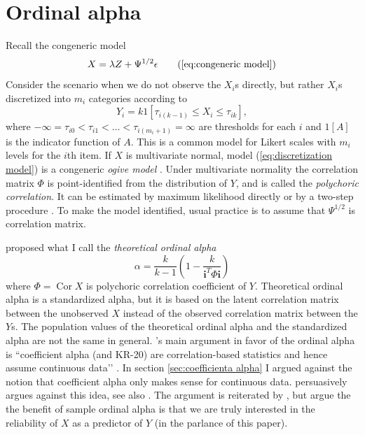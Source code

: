 \documentclass[twoside]{article}
\DeclareMathOperator{\Cor}{Cor}
\begin{document}
\section{Ordinal alpha\label{sec:Ordinal alpha}}

Recall the congeneric model
\begin{equation}
X=\lambda Z+\Psi^{1/2}\epsilon    \tag{\ref{eq:congeneric model}}
\end{equation}
Consider the scenario when we do not observe the $X_{i}$s directly,
but rather $X_{i}$s discretized into $m_{i}$ categories according
to
\begin{equation}
Y_{i}=k1[\tau_{i(k-1)}\leq X_{i}\leq\tau_{ik}],\label{eq:discretization model}
\end{equation}
where $-\infty=\tau_{i0}<\tau_{i1}<\ldots<\tau_{i(m_{i}+1)}=\infty$
are thresholds for each $i$ and $1[A]$ is the indicator function of $A$.
This is a common model for Likert scales with $m_{i}$ levels for
the $i$th item. If $X$ is multivariate normal, model (\ref{eq:discretization model})
is a congeneric \emph{ogive model} \citep{Swaminathan2016-rg}.
Under multivariate normality the correlation matrix $\Phi$ is point-identified
from the distribution of $Y$, and is called the \emph{polychoric
correlation}. It can be estimated by maximum likelihood directly
or by a two-step procedure \citep{Olsson1979-ti}. To make the model
identified, usual practice is to assume that $\Psi^{1/2}$ is correlation
matrix. 

\citet{Zumbo2007-ap} proposed what I call the \emph{theoretical ordinal
alpha}
\begin{equation}
\alpha=\frac{k}{k-1}\left(1-\frac{k}{\mathbf{i}^{T}\Phi\mathbf{i}}\right)\label{eq:ordinal alpha}
\end{equation}
where $\Phi=\Cor X$ is polychoric correlation coefficient of $Y$.
Theoretical ordinal alpha is a standardized alpha, but it is based
on the latent correlation matrix between the unobserved $X$ instead
of the observed correlation matrix between the $Y$s. The population
values of the theoretical ordinal alpha and the standardized alpha
are not the same in general. \citet{Zumbo2007-ap}'s main argument
in favor of the ordinal alpha is ``coefficient alpha (and KR-20)
are correlation-based statistics and hence assume continuous data\textquoteright \textquoteright{}
\citep[p. 27]{Zumbo2007-ap}. In section \ref{sec:coefficienta alpha} I argued against the notion that coefficient alpha only makes sense for continuous data. \citet[p. 1060, "Misconcetion 1"]{Chalmers2018-fj}
persuasively argues against this idea, see also \citep{Raykov2019-yr}. The argument is reiterated
by \citep{Gadermann2012-jl}, but \citet{Zumbo2019-lm} argue
the the benefit of sample ordinal alpha is that we are truly interested
in the reliability of $X$ as a predictor of $Y$ (in the parlance
of this paper). 
\end{document}

